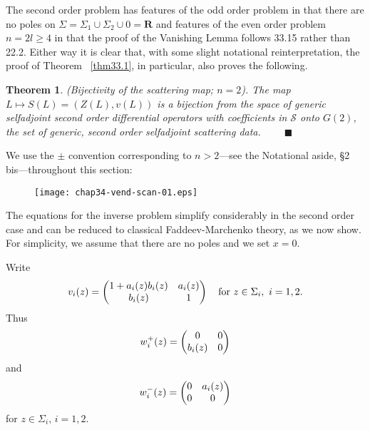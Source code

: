 \documentclass{surv-l}
\theoremstyle{plain}
\newtheorem{theorem}{Theorem}[section]
\theoremstyle{definition}
\numberwithin{equation}{chapter}
\begin{document}
The second order problem has features of the odd order problem in that there are no poles on $\Sigma=\Sigma_{1}\cup\Sigma_{2}\cup 0=\mathbf{R}$ and features of the even order problem $n=2l\geq 4$ in that the proof of the Vanishing Lemma follows 33.15 rather than 22.2. Either way it is clear that, with some slight notational reinterpretation, the proof of Theorem ~\ref{thm33.1}, in particular, also proves the following.
\renewcommand\thetheorem{34.\arabic{theorem}}
\begin{theorem}\label{eq34.1}
\emph{(Bijectivity of the scattering map; $n=2$)}. The map $ L\mapsto S(L)=(Z(L), v(L))$ is a bijection from the space of generic selfadjoint second order differential operators with coefficients in $\mathscr{S}$ onto $G(2)$, the set of generic, second order selfadjoint scattering data. $\qquad\blacksquare$
\end{theorem}

We use the $\pm$ convention corresponding to $n> 2$---see the Notational aside, \S 2 bis---throughout this section:


\begin{figure}
\texttt{[image: chap34-vend-scan-01.eps]}
\caption{}
\end{figure}

The equations for the inverse problem simplify considerably in the second order case and can be reduced to classical Faddeev-Marchenko theory, as we now show. For simplicity, we assume that there are no poles and we set $x=0$.

Write
\begin{equation*}
v_{i}(z)=\left(\begin{array}{@{}cc@{}}
1+  a_{i}(z)b_{i}(z) & a_{i}(z)\\
  b_{i}(z) & 1
\end{array}\right)\quad \mathrm{for}\ z\in\Sigma_{i},\ i=1,2.
\end{equation*}
Thus
\begin{equation*}
w_{i}^{+}(z)=\left(\begin{array}{@{}cc@{}}
0 & 0\\
b_{i}(z) & 0
\end{array}\right)
\end{equation*}
and
\begin{equation*}
w_{i}^{-}(z)=\left(\begin{array}{@{}cc@{}}
0 & a_{i}(z)\\
0 & 0
\end{array}\right)
\end{equation*}
for $z\in\Sigma_{i},\, i=1,2$.
\end{document}
